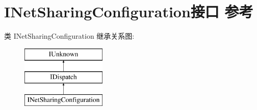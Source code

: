 \hypertarget{interface_i_net_sharing_configuration}{}\section{I\+Net\+Sharing\+Configuration接口 参考}
\label{interface_i_net_sharing_configuration}
类 I\+Net\+Sharing\+Configuration 继承关系图\+:\begin{figure}[H]
\begin{center}
\leavevmode
\includegraphics[height=3.000000cm]{interface_i_net_sharing_configuration}
\end{center}
\end{figure}
